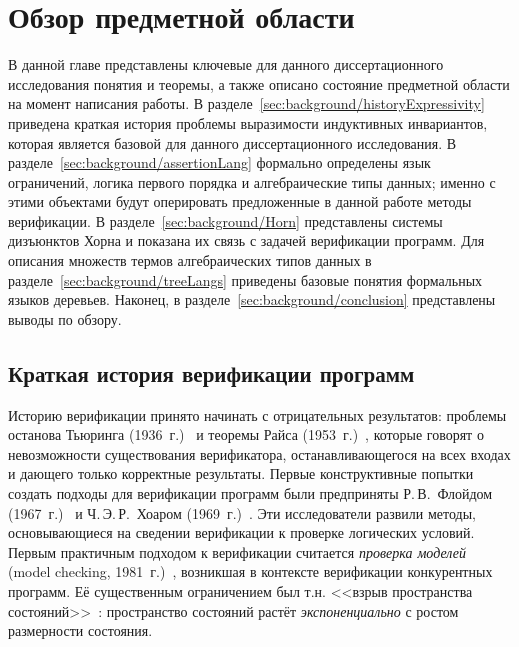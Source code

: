 \chapter{Обзор предметной области}\label{ch:background}

В данной главе представлены ключевые для данного диссертационного исследования понятия и теоремы, а также описано состояние предметной области на момент написания работы.
В разделе~\cref{sec:background/historyExpressivity} приведена краткая история проблемы выразимости индуктивных инвариантов, которая является базовой для данного диссертационного исследования.
В разделе~\cref{sec:background/assertionLang} формально определены язык ограничений, логика первого порядка и алгебраические типы данных; именно с этими объектами будут оперировать предложенные в данной работе  методы верификации.
В разделе~\cref{sec:background/Horn} представлены системы дизъюнктов Хорна и показана их связь с задачей  верификации программ.
Для описания множеств термов алгебраических типов данных в разделе~\cref{sec:background/treeLangs} приведены базовые понятия формальных языков деревьев.
Наконец, в разделе~\cref{sec:background/conclusion} представлены выводы по обзору.


\section{Краткая история верификации программ}\label{sec:background/historyVerification}

Историю верификации принято начинать с отрицательных результатов: проблемы останова Тьюринга (1936~г.)~\cite{turing1936computable} и теоремы Райса (1953~г.)~\cite{10.2307/1990888}, которые говорят о невозможности существования верификатора, останавливающегося на всех входах и дающего только корректные результаты.
Первые конструктивные попытки создать подходы для верификации программ были предприняты  Р.\,В.~Флойдом (1967~г.)~\cite{Floyd1993} и Ч.\,Э.\,Р.~Хоаром (1969~г.)~\cite{10.1145/363235.363259}. Эти исследователи развили методы, основывающиеся на  сведении верификации к проверке логических условий.
Первым практичным подходом к верификации считается \emph{проверка моделей} (model checking, 1981~г.)~\cite{10.1007/BFb0025774}, возникшая в контексте верификации конкурентных программ.
Её существенным ограничением был т.\:н. <<взрыв пространства состояний>>~\cite{10.1007/978-3-540-69850-0_1}: пространство состояний растёт \emph{экспоненциально} с ростом размерности состояния.

